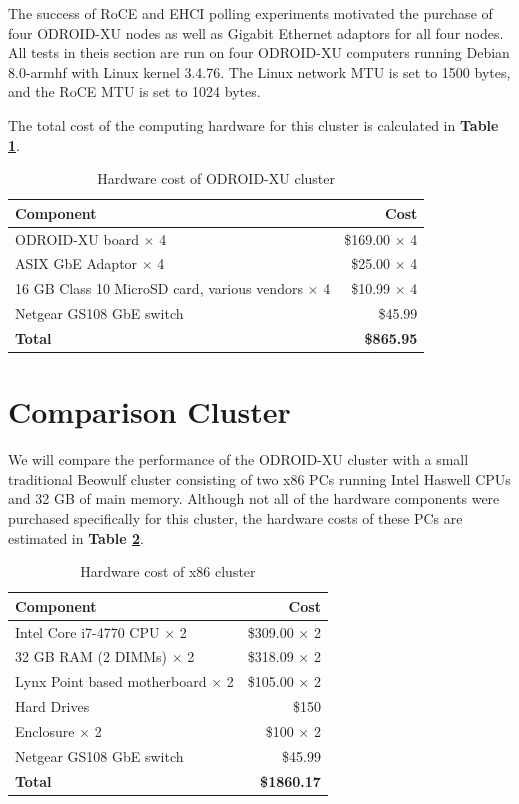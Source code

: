 \documentclass[11pt]{book}
\begin{document}
The success of RoCE and EHCI polling experiments motivated the purchase of four
ODROID-XU nodes as well as Gigabit Ethernet adaptors for all four nodes. All
tests in theis section are run on four ODROID-XU computers running Debian
8.0-armhf with Linux kernel 3.4.76. The Linux network MTU is set to 1500 bytes,
and the RoCE MTU is set to 1024 bytes.

The total cost of the computing hardware for this cluster is calculated in
\textbf{Table \ref{xu-cost-table}}.

\begin{table}
  \caption{Hardware cost of ODROID-XU cluster}
  \label{xu-cost-table}
  \centering
  \begin{tabular}{| l | r |}
    \hline
    \textbf{Component} & \textbf{Cost} \\ \hline
    ODROID-XU board $\times$ 4 & \$169.00 $\times$ 4 \\
    ASIX GbE Adaptor $\times$ 4 & \$25.00 $\times$ 4 \\
    16 GB Class 10 MicroSD card, various vendors $\times$ 4 & \$10.99 $\times$ 4 \\
    Netgear GS108 GbE switch & \$45.99 \\
    \hline
    \textbf{Total} & \textbf{\$865.95} \\ \hline
  \end{tabular}
\end{table}

\section{\textbf{Comparison Cluster}}

We will compare the performance of the ODROID-XU cluster with a small
traditional Beowulf cluster consisting of two x86 PCs running Intel Haswell CPUs
and 32 GB of main memory. Although not all of the hardware components were
purchased specifically for this cluster, the hardware costs of these PCs are
estimated in \textbf{Table \ref{x86-cost-table}}.

\begin{table}
  \caption{Hardware cost of x86 cluster}
  \label{x86-cost-table}
  \centering
  \begin{tabular}{| l | r |}
    \hline
    \textbf{Component} & \textbf{Cost} \\
    \hline
    Intel Core i7-4770 CPU $\times$ 2 & \$309.00 $\times$ 2 \\
    32 GB RAM (2 DIMMs) $\times$ 2 & \$318.09 $\times$ 2 \\
    Lynx Point based motherboard $\times$ 2 & \$105.00 $\times$ 2 \\
    Hard Drives & \$150 \\
    Enclosure $\times$ 2 & \$100 $\times$ 2 \\
    Netgear GS108 GbE switch & \$45.99 \\
    \hline
    \textbf{Total} & \textbf{\$1860.17} \\ \hline
  \end{tabular}
\end{table}
\end{document}
